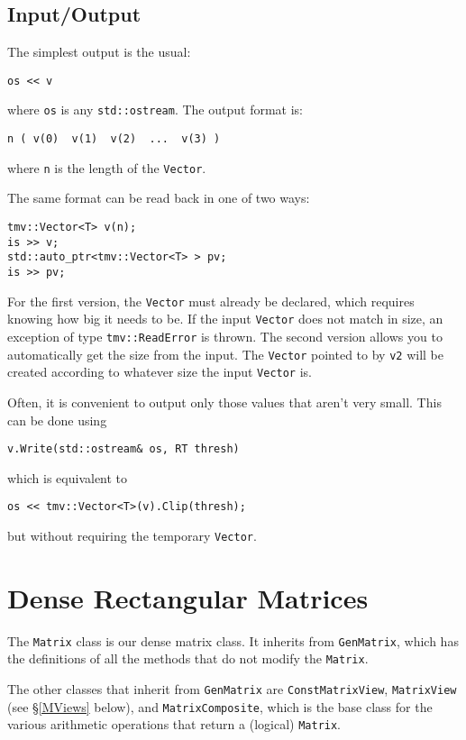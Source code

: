 \documentclass[twoside,letterpaper,11pt]{article}
\renewcommand{\tt}[1]{{\texttt {#1}}}
\begin{document}
\subsection{Input/Output}

The simplest output is the usual:
\begin{verbatim}
os << v
\end{verbatim}
where \tt{os} is any \tt{std::ostream}.
The output format is:
\begin{verbatim}
n ( v(0)  v(1)  v(2)  ...  v(3) )
\end{verbatim}
where \tt{n} is the length of the \tt{Vector}.

The same format can be read back in one of two ways:
\begin{verbatim}
tmv::Vector<T> v(n);
is >> v;
std::auto_ptr<tmv::Vector<T> > pv;
is >> pv;
\end{verbatim}
For the first version, the \tt{Vector} must already be declared, which 
requires knowing how big it needs to be.  If the input \tt{Vector} does not
match in size, an exception of type \tt{tmv::ReadError} is thrown.
The second version allows you to automatically get the size from the input.  
The \tt{Vector} pointed to by \tt{v2}
will be created according to whatever size the input \tt{Vector} is.

Often, it is convenient to output only those values that aren't very small. 
This can be done using
\begin{verbatim}
v.Write(std::ostream& os, RT thresh)
\end{verbatim}
which is equivalent to
\begin{verbatim}
os << tmv::Vector<T>(v).Clip(thresh);
\end{verbatim}
but without requiring the temporary \tt{Vector}.

\newpage
\section{Dense Rectangular Matrices}

The \tt{Matrix} class is our dense matrix class.  It inherits from \tt{GenMatrix},
which has the definitions of all the methods that 
do not modify the \tt{Matrix}.

The other classes that inherit from \tt{GenMatrix} are \tt{ConstMatrixView},
\tt{MatrixView} (see \S\ref{MViews} below), and \tt{MatrixComposite}, which 
is the base class for the various arithmetic operations that return a 
(logical) \tt{Matrix}.  
\end{document}
